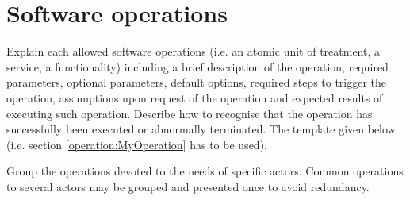 \chapter{Software operations}
\label{chap:soptware_operations}


Explain each allowed software operations (i.e. an atomic unit of treatment, a service, a functionality) including a brief description of the operation, required parameters, optional parameters, default options, required steps to trigger the operation, assumptions upon request of the operation and expected results of executing such operation.
Describe how to recognise that the operation has successfully been executed or
abnormally terminated. The template given below (i.e. section \ref{operation:MyOperation} has to be used).

Group the operations devoted to the needs of specific actors. Common
operations to several actors may be grouped and presented once to avoid redundancy.







